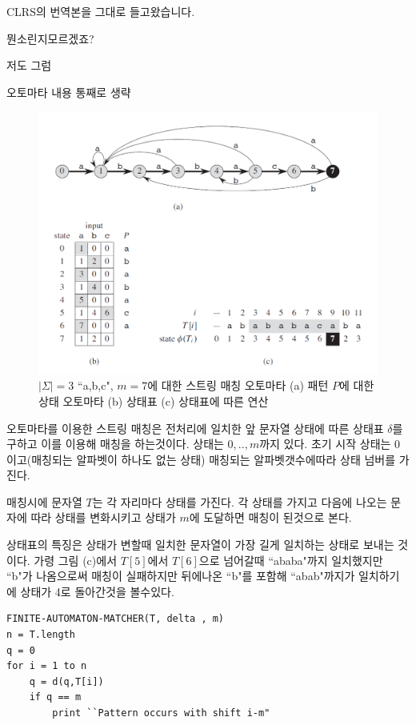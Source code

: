 CLRS의 번역본을 그대로 들고왔습니다.


뭔소린지모르겠죠?

저도 그럼

오토마타 내용 통째로 생략

\newpage



\begin{figure}[h!]
    \centering
    \includegraphics[scale=0.4]{./string_matching/pic2.PNG}
    \caption{$|\Sigma|  = 3$ ``a,b,c", $m = 7$에 대한 스트링 매칭 오토마타
    (a) 패턴 $P$에 대한 상태 오토마타 (b) 상태표 (c) 상태표에 따른 연산}
\end{figure}

오토마타를 이용한 스트링 매칭은 전처리에 일치한 앞 문자열 상태에 따른 상태표 $\delta$를 구하고 이를 이용해 매칭을 하는것이다.
상태는 $0,..,m$까지 있다. 초기 시작 상태는 0이고(매칭되는 알파벳이 하나도 없는 상태)
매칭되는 알파벳갯수에따라 상태 넘버를 가진다.

매칭시에 문자열 $T$는 각 자리마다 상태를 가진다. 각 상태를 가지고 다음에 나오는 문자에 따라 상태를 변화시키고 상태가 $m$에 도달하면 매칭이 된것으로 본다.

상태표의 특징은 상태가 변할때 일치한 문자열이 가장 길게 일치하는 상태로 보내는 것이다.
가령 그림 (c)에서 $T[5]$에서 $T[6]$으로 넘어갈때 ``ababa"까지 일치했지만 ``b"가 나옴으로써 매칭이 실패하지만 뒤에나온 ``b"를 포함해 ``abab"까지가 일치하기에 상태가 4로 돌아간것을 볼수있다.

\begin{lstlisting}[style = CStyle]
FINITE-AUTOMATON-MATCHER(T, delta , m)
n = T.length
q = 0 
for i = 1 to n
    q = d(q,T[i])
    if q == m
        print ``Pattern occurs with shift i-m"
\end{lstlisting}


